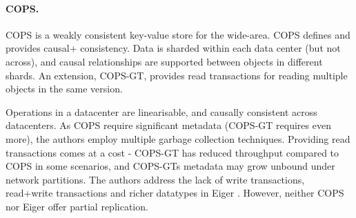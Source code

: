 %


\paragraph{COPS.} COPS \cite{cops} is a weakly consistent key-value store for the wide-area.
COPS defines and provides causal+ consistency. 
Data is sharded within each data center (but not across), and causal relationships are supported between objects in different shards.
An extension, COPS-GT, provides read transactions for reading multiple objects in the same version.

Operations in a datacenter are linearisable, and causally consistent across datacenters.
As COPS require significant metadata (COPS-GT requires even more), the authors employ multiple garbage collection techniques.
Providing read transactions comes at a cost - COPS-GT has reduced throughput compared to COPS in some scenarios, and COPS-GTs metadata may grow unbound under network partitions.
The authors address the lack of write transactions, read+write transactions and richer datatypes in Eiger \cite{eiger}.
However, neither COPS nor Eiger offer partial replication.

